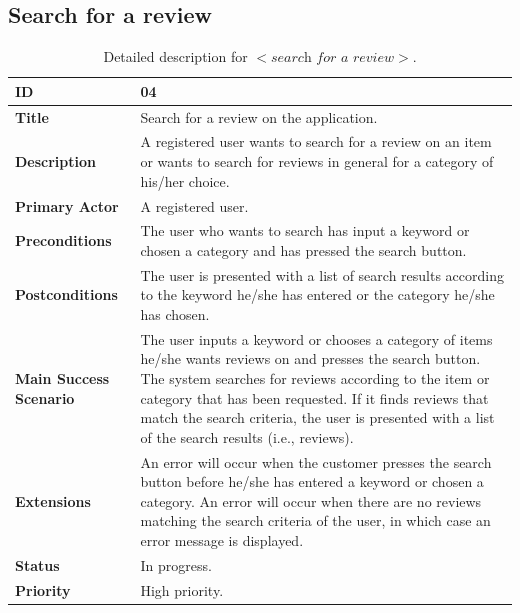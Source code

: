 \documentclass[11pt]{extarticle}
\begin{document}
\subsection{Search for a review}
\begin{table}[H]
    \begin{center}
        \begin{tabular}{ |m{6cm}|p{6cm}| } 
           \hline
           \textbf{ID} & 04\\
           \hline
           \textbf{Title} & Search for a review on the application.\\
           \hline
           \textbf{Description} & A registered user wants to search for a review on an item or wants to search for reviews in general for a category of his/her choice.\\
           \hline
           \textbf{Primary Actor} & A registered user.\\
           \hline
           \textbf{Preconditions} & The user who wants to search has input a keyword or chosen a category and has pressed the search button.\\
           \hline
           \textbf{Postconditions} & The user is presented with a list of search results according to the keyword he/she has entered or the category he/she has chosen.\\
           \hline
           \textbf{Main Success Scenario} & The user inputs a keyword or chooses a category of items he/she wants reviews on and presses the search button. The system searches for reviews according to the item or category that has been requested. If it finds reviews that match the search criteria, the user is presented with a list of the search results (i.e., reviews).\\
           \hline
           \textbf{Extensions} & An error will occur when the customer presses the search button before he/she has entered a keyword or chosen a category. \newline An error will occur when there are no reviews matching the search criteria of the user, in which case an error message is displayed.\\
           \hline
           \textbf{Status} & In progress.\\
           \hline
           \textbf{Priority} & High priority.\\
           \hline
        \end{tabular}
    \end{center}
    \caption{\label{tab:Table 4} Detailed description for $<\textit{search for a review}>$.}
\end{table}
\end{document}
